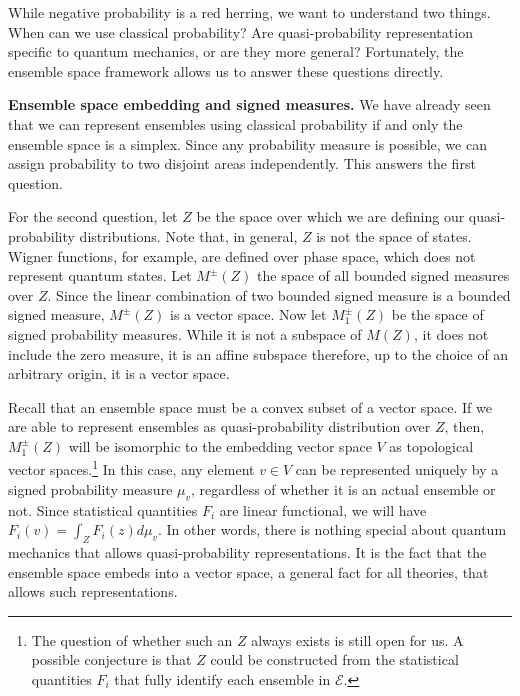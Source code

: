 \documentclass[10pt,twocolumn, nofootinbib]{revtex4-2}
\newcommand{\Ens}[1][E] {\mathcal{#1}} %
\begin{document}
While negative probability is a red herring, we want to understand two things. When can we use classical probability? Are quasi-probability representation specific to quantum mechanics, or are they more general? Fortunately, the ensemble space framework allows us to answer these questions directly.


\textbf{Ensemble space embedding and signed measures.} We have already seen that we can represent ensembles using classical probability if and only the ensemble space is a simplex. Since any probability measure is possible, we can assign probability to two disjoint areas independently. This answers the first question.

For the second question, let $Z$ be the space over which we are defining our quasi-probability distributions.
Note that, in general, $Z$ is not the space of states. Wigner functions, for example, are defined over phase space, which does not represent quantum states. Let $M^{\pm}(Z)$ the space of all bounded signed measures over $Z$. Since the linear combination of two bounded signed measure is a bounded signed measure, $M^{\pm}(Z)$ is a vector space. Now let $M_1^{\pm}(Z)$ be the space of signed probability measures. While it is not a subspace of $M(Z)$, it does not include the zero measure, it is an affine subspace therefore, up to the choice of an arbitrary origin, it is a vector space.

Recall that an ensemble space must be a convex subset of a vector space. If we are able to represent ensembles as quasi-probability distribution over $Z$, then, $M_1^{\pm}(Z)$ will be isomorphic to the embedding vector space $V$ as topological vector spaces.\footnote{The question of whether such an $Z$ always exists is still open for us. A possible conjecture is that $Z$ could be constructed from the statistical quantities $F_i$ that fully identify each ensemble in $\Ens$.} In this case, any element $v\in V$ can be represented uniquely by a signed probability measure $\mu_{v}$, regardless of whether it is an actual ensemble or not. Since statistical quantities $F_i$ are linear functional, we will have $F_i(v) = \int_Z F_i(z) d\mu_{v}$. In other words, there is nothing special about quantum mechanics that allows quasi-probability representations. It is the fact that the ensemble space embeds into a vector space, a general fact for all theories, that allows such representations.
\end{document}
